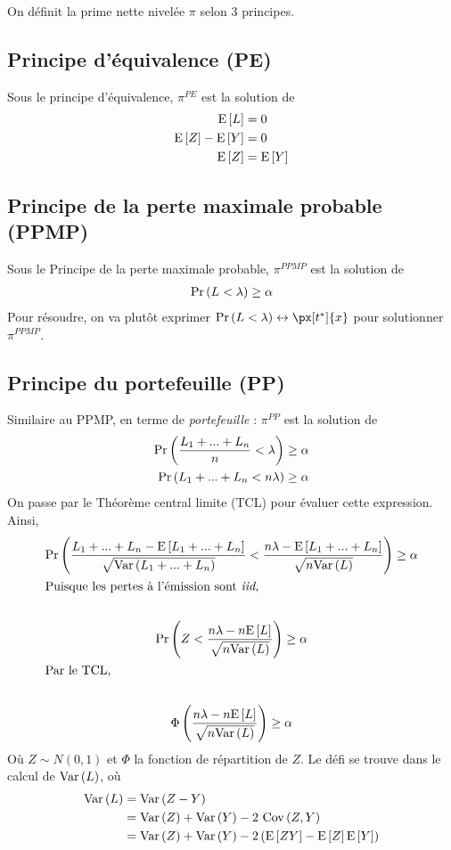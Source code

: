 \documentclass[10pt, french]{article}
\begin{document}
\begin{multicols*}{3}
On définit la prime nette nivelée $\pi$ selon 3 principes. 

\subsection{Principe d'équivalence (PE)}
Sous le principe d'équivalence, $\pi^{PE}$ est la solution de
\begin{align*}
\mathrm{E} \left[ L \right]	& = 0 \\
\mathrm{E} \left[ Z \right] - \mathrm{E} \left[ Y \right]	& = 0 \\
\mathrm{E} \left[ Z \right] & = \mathrm{E} \left[ Y \right] \\
\end{align*}


\subsection{Principe de la perte maximale probable (PPMP)}
Sous le Principe de la perte maximale probable, $\pi^{PPMP}$ est la solution de
\begin{align*}
\Pr \left( L < \lambda \right) \geq \alpha
\end{align*}
Pour résoudre, on va plutôt exprimer $\prob{L < \lambda} \leftrightarrow \px[t^*]{x}$ pour solutionner $\pi^{PPMP}$.


\subsection{Principe du portefeuille (PP)}
Similaire au PPMP, en terme de \emph{portefeuille} : $\pi^{PP}$ est la solution de
\begin{align*}
\Pr \left( \frac{L_1 + ... + L_n}{n} < \lambda \right) &  \geq \alpha \\
\Pr \left( L_1 + ... + L_n < n \lambda \right) & \geq \alpha \\
\end{align*}
On passe par le Théorème central limite (TCL) pour évaluer cette expression. Ainsi,
\begin{gather*}
\Pr \left( \frac{L_1 + ... + L_n - \mathrm{E} \left[ L_1 + ... + L_n \right]}{\sqrt{\mathrm{Var} \left( L_1 + ... + L_n \right)}} < \frac{n \lambda - \mathrm{E} \left[ L_1 + ... + L_n \right]}{\sqrt{n \mathrm{Var} \left( L \right)}}   \right)  \geq \alpha \\
\shortintertext{Puisque les pertes à l'émission sont \emph{iid,}} \\
\Pr \left( Z < \frac{n \lambda - n \mathrm{E} \left[ L \right]}{\sqrt{n \mathrm{Var} \left( L \right)}} \right)  \geq \alpha \\
\shortintertext{Par le TCL,} \\
\Phi \left( \frac{n \lambda - n \mathrm{E} \left[ L \right]}{\sqrt{n \mathrm{Var} \left( L \right)}} \right)  \geq \alpha \\
\end{gather*}
Où $Z \sim N(0,1)$ et $\Phi$ la fonction de répartition de $Z$. Le défi se trouve dans le calcul de $\mathrm{Var} \left( L \right)$, où
\begin{align*}
\mathrm{Var} \left( L \right)	& = \mathrm{Var} \left( Z - Y \right) \\
& = \mathrm{Var} \left( Z \right) + \mathrm{Var} \left( Y \right) - 2 \  \mathrm{Cov} \left( Z, Y \right) \\
& = \mathrm{Var} \left( Z \right)  + \mathrm{Var} \left( Y \right) - 2 \left( \mathrm{E} \left[ ZY \right] - \mathrm{E} \left[ Z \right] \mathrm{E} \left[ Y \right] \right) \\
\end{align*}


\end{multicols*}
\end{document}
